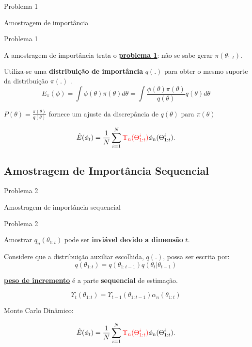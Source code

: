 \documentclass{beamer}
\begin{document}
\begin{frame}{Problema 1}
    \begin{block}{}
      \Huge  Amostragem de importância
    \end{block}
\end{frame}


\begin{frame}{Problema 1}

A amostragem de importância trata o \textbf{\underline{problema 1}}: não se sabe gerar $\pi(\theta_{1:t})$.

\vspace{0.5cm}
\pause

Utiliza-se uma \textbf{distribuição de importância} $q(.)$ para obter o mesmo suporte da distribuição $\pi(.)$ .
$$
E_{\pi}(\phi)=\int \phi(\theta) \pi(\theta) d\theta = \int \frac{ \phi(\theta) \pi(\theta)}{q(\theta)} q(\theta) d\theta
$$

\pause
 $P(\theta) = \frac{\pi(\theta)}{q(\theta)}$  fornece um ajuste da discrepância de $q(\theta)$ para $\pi(\theta)$ 


$$
\hat{E}(\phi_t) = \frac{1}{N} \sum_{i=1}^N \textcolor{red}{\Upsilon_n(\Theta^i_{1:t})} \phi_n(\Theta^i_{1:t}).
$$


\end{frame}




\subsection{Amostragem de Importância Sequencial}

\begin{frame}{Problema 2}
    \begin{block}{}
      \Huge  Amostragem de importância sequencial
    \end{block}
\end{frame}




\begin{frame}{Problema 2}

Amostrar $q_n(\theta_{1:t})$ pode ser \textbf{inviável devido a dimensão} $t$.

\vspace{0.5cm}

\pause

Considere que a distribuição auxiliar escolhida, $q(.)$, possa ser escrita por:
$$ q(\theta_{1:t})  = q(\theta_{1:t-1})q(\theta_t|\theta_{t-1})$$

\vspace{0.5cm}

\pause

\underline{\textbf{peso de incremento}} é a parte \textbf{sequencial} de estimação.


$$
\Upsilon_t(\theta_{1:t}) = \Upsilon_{t-1}(\theta_{1:t-1}) \alpha_n(\theta_{1:t})
$$


Monte Carlo Dinâmico:

$$
\hat{E}(\phi_t) = \frac{1}{N} \sum_{i=1}^N \textcolor{red}{\Upsilon_n(\Theta^i_{1:t})} \phi_n(\Theta^i_{1:t}).
$$


\end{frame}
\end{document}
